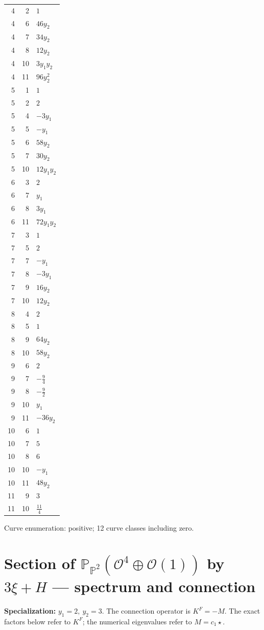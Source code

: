 \documentclass[10pt,a4paper]{article}
\begin{document}
{\begin{longtable}{rrp{125mm}}
4 & 2 & $1$\\
4 & 6 & $46 y_{2}$\\
4 & 7 & $34 y_{2}$\\
4 & 8 & $12 y_{2}$\\
4 & 10 & $3 y_{1} y_{2}$\\
4 & 11 & $96 y_{2}^{2}$\\
5 & 1 & $1$\\
5 & 2 & $2$\\
5 & 4 & $- 3 y_{1}$\\
5 & 5 & $- y_{1}$\\
5 & 6 & $58 y_{2}$\\
5 & 7 & $30 y_{2}$\\
5 & 10 & $12 y_{1} y_{2}$\\
6 & 3 & $2$\\
6 & 7 & $y_{1}$\\
6 & 8 & $3 y_{1}$\\
6 & 11 & $72 y_{1} y_{2}$\\
7 & 3 & $1$\\
7 & 5 & $2$\\
7 & 7 & $- y_{1}$\\
7 & 8 & $- 3 y_{1}$\\
7 & 9 & $16 y_{2}$\\
7 & 10 & $12 y_{2}$\\
8 & 4 & $2$\\
8 & 5 & $1$\\
8 & 9 & $64 y_{2}$\\
8 & 10 & $58 y_{2}$\\
9 & 6 & $2$\\
9 & 7 & $- \frac{9}{4}$\\
9 & 8 & $- \frac{9}{2}$\\
9 & 10 & $y_{1}$\\
9 & 11 & $- 36 y_{2}$\\
10 & 6 & $1$\\
10 & 7 & $5$\\
10 & 8 & $6$\\
10 & 10 & $- y_{1}$\\
10 & 11 & $48 y_{2}$\\
11 & 9 & $3$\\
11 & 10 & $\frac{11}{4}$\\
\end{longtable}}
Curve enumeration: positive; 12 curve classes including zero.
\clearpage\section*{Section of $\mathbb P_{\mathbb P^{2}}(\mathcal O^{4}\oplus \mathcal O(1))$ by $3\xi +H$ --- spectrum and connection}
\textbf{Specialization:} $y_1=2,\ y_2=3$. The connection operator is $K^F=-M$. The exact factors below refer to $K^F$; the numerical eigenvalues refer to $M=c_1\star$.
\end{document}
